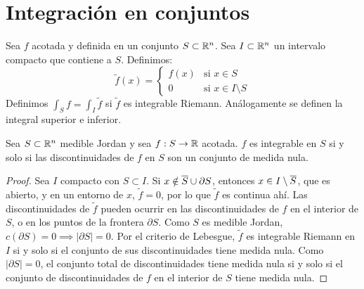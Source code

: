\section{Integración en conjuntos}

\begin{definition}
  Sea \(f\) acotada y definida en un conjunto \(S \subset \mathbb{R}^n\). Sea \(I \subset \mathbb{R}^n\) un intervalo compacto que contiene a \(S\). Definimos:
  \[ \tilde{f}(x) = \begin{cases} f(x) & \text{si } x \in S \\ 0 & \text{si } x \in I \setminus S \end{cases} \]
  Definimos \(\int_S f = \int_I \tilde{f}\) si \(\tilde{f}\) es integrable Riemann. Análogamente se definen la integral superior e inferior.
\end{definition}

\begin{theorem}
  Sea \(S \subset \mathbb{R}^n\) medible Jordan y sea \(f: S \to \mathbb{R}\) acotada. \(f\) es integrable en \(S\) si y solo si las discontinuidades de \(f\) en \(S\) son un conjunto de medida nula.
\end{theorem}
\begin{proof}
  Sea \(I\) compacto con \(S \subset I\). Si \(x \notin \overline{S} \cup \partial S\), entonces \(x \in I \setminus \overline{S}\), que es abierto, y en un entorno de \(x\), \(\tilde{f} = 0\), por lo que \(\tilde{f}\) es continua ahí.
  Las discontinuidades de \(\tilde{f}\) pueden ocurrir en las discontinuidades de \(f\) en el interior de \(S\), o en los puntos de la frontera \(\partial S\).
  Como \(S\) es medible Jordan, \(c(\partial S) = 0 \implies |\partial S| = 0\).
  Por el criterio de Lebesgue, \(\tilde{f}\) es integrable Riemann en \(I\) si y solo si el conjunto de sus discontinuidades tiene medida nula.
  Como \(|\partial S| = 0\), el conjunto total de discontinuidades tiene medida nula si y solo si el conjunto de discontinuidades de \(f\) en el interior de \(S\) tiene medida nula.
\end{proof}